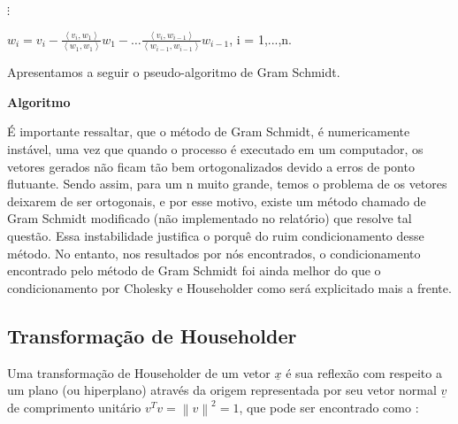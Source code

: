 \documentclass[12pt, a4paper]{article}
\begin{document}
$\vdots$

\noindent
$w_{i} =  v_{i} - \frac{\left \langle v_{i},w_{1} \right \rangle}{\left \langle w_{1},w_{1} \right \rangle}w_{1} - \ldots \frac{\left \langle v_{i},w_{i-1} \right \rangle}{\left \langle w_{i-1},w_{i-1} \right \rangle}w_{i-1}$, \hspace{1mm} i = 1,...,n.\\ \vspace{2mm}

\noindent
Apresentamos a seguir o pseudo-algoritmo de Gram Schmidt.
\begin{algorithm}
   \SetAlgoLined
   
   \label{alg1}
   \caption*{\textbf{Algoritmo}}
 \end{algorithm}

É importante ressaltar, que o método de Gram Schmidt, é numericamente instável, uma vez que quando o processo é executado em um computador, os vetores gerados não ficam tão bem ortogonalizados devido a erros de ponto flutuante. Sendo assim, para um n muito grande, temos o problema de os vetores deixarem de ser ortogonais, e por esse motivo, existe um método chamado de Gram Schmidt modificado (não implementado no relatório) que resolve tal questão. Essa instabilidade justifica o porquê do ruim condicionamento desse método. No entanto, nos resultados por nós encontrados, o condicionamento encontrado pelo método de Gram Schmidt foi ainda melhor do que o condicionamento por Cholesky e Householder como será explicitado mais a frente. 






\subsection{Transformação de Householder}

Uma transformação de Householder de um vetor $\underline{x}$ é sua reflexão com respeito a um plano (ou hiperplano) através da origem representada por seu vetor normal $\underline{v}$ de comprimento unitário $v^{T}v =  \left \| v \right \|^{2} = 1$, que pode ser encontrado como :
\end{document}
